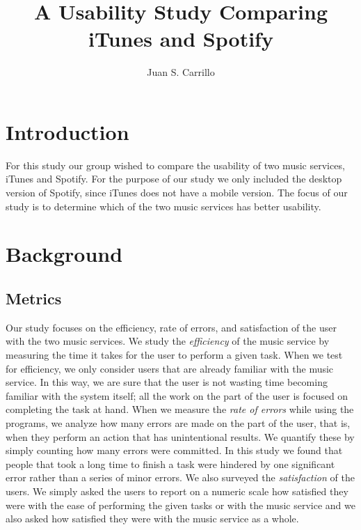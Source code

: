 \documentclass[11pt]{article}
\title{A Usability Study Comparing iTunes and Spotify}
\author{Juan S. Carrillo}
\begin{document}
\maketitle
\section{Introduction}
For this study our group wished to compare the usability of two music services, iTunes and Spotify. For the purpose of our study we only included the desktop version of Spotify, since iTunes does not have a mobile version. The focus of our study is to determine which of the two music services has better usability.
\section{Background}
\subsection{Metrics}
Our study focuses on the efficiency, rate of errors, and satisfaction of the user with the two music services. We study the \textit{efficiency} of the music service by measuring the time it takes for the user to perform a given task. When we test for efficiency, we only consider users that are already familiar with the music service. In this way, we are sure that the user is not wasting time becoming familiar with the system itself; all the work on the part of the user is focused on completing the task at hand. When we measure the \textit{rate of errors} while using the programs, we analyze how many errors are made on the part of the user, that is, when they perform an action that has unintentional results. We quantify these by simply counting how many errors were committed. In this study we found that people that took a long time to finish a task were hindered by one significant error rather than a series of minor errors.  We also surveyed the \textit{satisfaction} of the users. We simply asked the users to report on a numeric scale how satisfied they were with the ease of performing the given tasks or with the music service and we also asked how satisfied they were with the music service as a whole.
\end{document}
